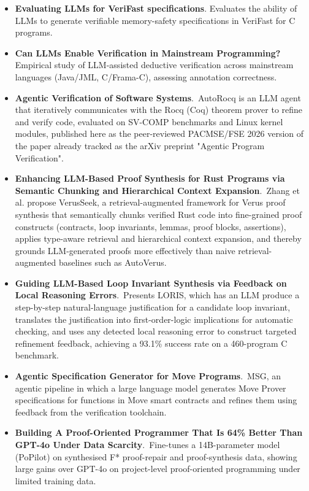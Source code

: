 \documentclass[natbib=false,acmsmall,nonacm,11pt]{acmart}
\begin{document}
\begin{itemize}
\item \textbf{Evaluating LLMs for VeriFast specifications}. Evaluates the ability of LLMs to generate verifiable memory-safety specifications in VeriFast for C programs.~\cite{DBLP:journals/corr/abs-2411-02318}
\item \textbf{Can LLMs Enable Verification in Mainstream Programming?} Empirical study of LLM-assisted deductive verification across mainstream languages (Java/JML, C/Frama-C), assessing annotation correctness.~\cite{DBLP:journals/corr/abs-2503-14183}
\item \textbf{Agentic Verification of Software Systems}.~AutoRocq is an LLM agent that iteratively communicates with the Rocq (Coq) theorem prover to refine and verify code, evaluated on SV-COMP benchmarks and Linux kernel modules, published here as the peer-reviewed PACMSE/FSE 2026 version of the paper already tracked as the arXiv preprint "Agentic Program Verification".~\cite{DBLP:journals/pacmse/TuZSZMR26}
\item \textbf{Enhancing LLM-Based Proof Synthesis for Rust Programs via Semantic Chunking and Hierarchical Context Expansion}.~Zhang et al. propose VerusSeek, a retrieval-augmented framework for Verus proof synthesis that semantically chunks verified Rust code into fine-grained proof constructs (contracts, loop invariants, lemmas, proof blocks, assertions), applies type-aware retrieval and hierarchical context expansion, and thereby grounds LLM-generated proofs more effectively than naive retrieval-augmented baselines such as AutoVerus.~\cite{DBLP:conf/tase/ZhangWXLCLQT26}
\item \textbf{Guiding LLM-Based Loop Invariant Synthesis via Feedback on Local Reasoning Errors}.~Presents LORIS, which has an LLM produce a step-by-step natural-language justification for a candidate loop invariant, translates the justification into first-order-logic implications for automatic checking, and uses any detected local reasoning error to construct targeted refinement feedback, achieving a 93.1\% success rate on a 460-program C benchmark.~\cite{DBLP:journals/toplas/LiYLDZ26}
\item \textbf{Agentic Specification Generator for Move Programs}.~MSG, an agentic pipeline in which a large language model generates Move Prover specifications for functions in Move smart contracts and refines them using feedback from the verification toolchain.~\cite{DBLP:conf/kbse/FuXK25}
\item \textbf{Building A Proof-Oriented Programmer That Is 64\% Better Than GPT-4o Under Data Scarcity}.~Fine-tunes a 14B-parameter model (PoPilot) on synthesised F* proof-repair and proof-synthesis data, showing large gains over GPT-4o on project-level proof-oriented programming under limited training data.~\cite{zhang-etal-2025-building}

\end{itemize}
\end{document}
